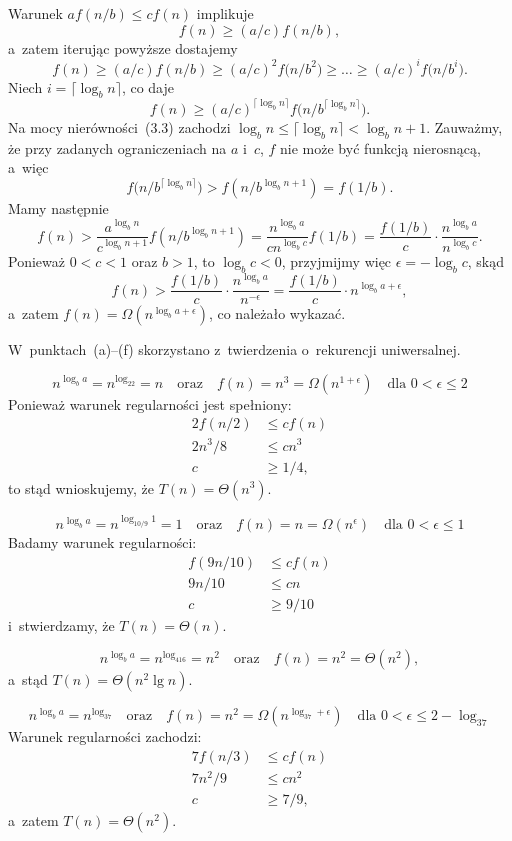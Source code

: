 \exercise %
Warunek $af(n/b)\le cf(n)$ implikuje
\[
	f(n) \ge (a/c)f(n/b),
\]
a~zatem iterując powyższe dostajemy
\[
	f(n) \ge (a/c)f(n/b) \ge (a/c)^2f\bigl(n/b^2\bigr) \ge \dots \ge (a/c)^if\bigl(n/b^i\bigr).
\]
Niech $i=\lceil\log_bn\rceil$, co daje
\[
	f(n) \ge (a/c)^{\lceil\log_bn\rceil}f\bigl(n/b^{\lceil\log_bn\rceil}\bigr).
\]
Na mocy nierówności~(3.3) zachodzi $\log_bn\le\lceil\log_b n\rceil<\log_bn+1$. Zauważmy, że przy zadanych ograniczeniach na $a$ i~$c$, $f$ nie może być funkcją nierosnącą, a~więc
\[
	f\bigl(n/b^{\lceil\log_bn\rceil}\bigr) > f(n/b^{\log_bn+1}) = f(1/b).
\]
Mamy następnie
\[
	f(n) > \frac{a^{\log_bn}}{c^{\log_bn+1}}f(n/b^{\log_bn+1}) = \frac{n^{\log_ba}}{cn^{\log_bc}}f(1/b) = \frac{f(1/b)}{c}\cdot\frac{n^{\log_ba}}{n^{\log_bc}}.
\]
Ponieważ $0<c<1$ oraz $b>1$, to $\log_bc<0$, przyjmijmy więc $\epsilon=-\log_bc$, skąd
\[
	f(n) > \frac{f(1/b)}{c}\cdot\frac{n^{\log_ba}}{n^{-\epsilon}} = \frac{f(1/b)}{c}\cdot n^{\log_ba+\epsilon},
\]
a~zatem $f(n)=\Omega(n^{\log_ba+\epsilon})$, co należało wykazać.

\problems

W~punktach~(a)\nobreakdash--(f) skorzystano z~twierdzenia o~rekurencji uniwersalnej.

\subproblem %
\[
	n^{\log_ba} = n^{\log_22} = n \quad\text{oraz}\quad f(n) = n^3 = \Omega(n^{1+\epsilon}) \quad\text{dla $0<\epsilon\le2$}
\]
Ponieważ warunek regularności jest spełniony:
\begin{align*}
	2f(n/2) &\le cf(n) \\
	2n^3\!/8 &\le cn^3 \\
	c &\ge 1/4,
\end{align*}
to stąd wnioskujemy, że $T(n)=\Theta(n^3)$.

\subproblem %
\[
	n^{\log_ba} = n^{\log_{10/9}1} = 1 \quad\text{oraz}\quad f(n) = n = \Omega(n^\epsilon) \quad\text{dla $0<\epsilon\le1$}
\]
Badamy warunek regularności:
\begin{align*}
	f(9n/10) &\le cf(n) \\
	9n/10 &\le cn \\
	c &\ge 9/10
\end{align*}
i~stwierdzamy, że $T(n)=\Theta(n)$.

\subproblem %
\[
	n^{\log_ba} = n^{\log_416} = n^2 \quad\text{oraz}\quad f(n) = n^2 = \Theta(n^2),
\]
a~stąd $T(n)=\Theta(n^2\lg n)$.

\subproblem %
\[
	n^{\log_ba} = n^{\log_37} \quad\text{oraz}\quad f(n) = n^2 = \Omega(n^{\log_37+\epsilon}) \quad\text{dla $0<\epsilon\le2-\log_37$}
\]
Warunek regularności zachodzi:
\begin{align*}
	7f(n/3) &\le cf(n) \\
	7n^2\!/9 &\le cn^2 \\
	c &\ge 7/9,
\end{align*}
a~zatem $T(n)=\Theta(n^2)$.

